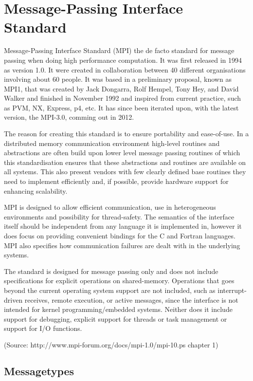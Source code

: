 \chapter{Message-Passing Interface Standard}
Message-Passing Interface Standard (MPI) the de facto standard for message passing when doing high performance computation. It was first released in 1994 as version 1.0. It were created in collaboration between 40 different organisations involving about 60 people. It was based in a preliminary proposal, known as MPI1, that was created by Jack Dongarra, Rolf Hempel, Tony Hey, and David Walker and finished in November 1992 and inspired from current practice, such as PVM, NX, Express, p4, etc. It has since been iterated upon, with the latest version, the MPI-3.0, comming out in 2012.

The reason for creating this standard is to ensure portability and ease-of-use. In a distributed memory communication environment high-level routines and abstractions are often build upon lower level message passing routines of which this standardisation ensures that these abstractions and routines are available on all systems. This also present vendors with few clearly defined base routines they need to implement efficiently and, if possible, provide hardware support for enhancing scalability.

MPI is designed to allow efficient communication, use in heterogeneous environments and possibility for thread-safety. The semantics of the interface itself should be independent from any language it is implemented in, however it does focus on providing convenient bindings for the C and Fortran languages. MPI also specifies how communication failures are dealt with in the underlying systems.

The standard is designed for message passing only and does not include specifications for explicit operations on shared-memory. Operations that goes beyond the current operating system support are not included, such as interrupt-driven receives, remote execution, or active messages, since the interface is not intended for kernel programming/embedded systems. Neither does it include support for debugging, explicit support for threads or task management or support for I/O functions.

(Source: http://www.mpi-forum.org/docs/mpi-1.0/mpi-10.ps chapter 1)

\section{Messagetypes}

